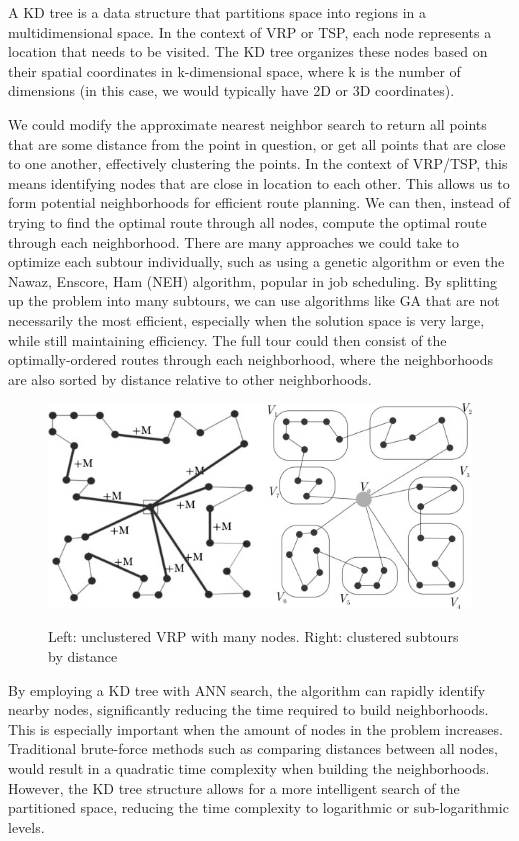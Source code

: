 \documentclass{article}
\begin{document}
A KD tree is a data structure that partitions space into regions in a multidimensional space. In the context of VRP or TSP, each node represents a location that needs to be visited. The KD tree organizes these nodes based on their spatial coordinates in k-dimensional space, where k is the number of dimensions (in this case, we would typically have 2D or 3D coordinates).

We could modify the approximate nearest neighbor search to return all points that are some distance from the point in question, or get all points that are close to one another, effectively clustering the points. In the context of VRP/TSP, this means identifying nodes that are close in location to each other. This allows us to form potential neighborhoods for efficient route planning. We can then, instead of trying to find the optimal route through all nodes, compute the optimal route through each neighborhood. There are many approaches we could take to optimize each subtour individually, such as using a genetic algorithm or even the Nawaz, Enscore, Ham (NEH) algorithm, popular in job scheduling. By splitting up the problem into many subtours, we can use algorithms like GA that are not necessarily the most efficient, especially when the solution space is very large, while still maintaining efficiency. The full tour could then consist of the optimally-ordered routes through each neighborhood, where the neighborhoods are also sorted by distance relative to other neighborhoods.

\begin{figure}[h]
    \centering
    \includegraphics[width=\textwidth,keepaspectratio]{Images/vrp_cluster.jpg}
    \label{fig:clustered_vrp}
    \caption{Left: unclustered VRP with many nodes. Right: clustered subtours by distance}
\end{figure}


By employing a KD tree with ANN search, the algorithm can rapidly identify nearby nodes, significantly reducing the time required to build neighborhoods. This is especially important when the amount of nodes in the problem increases. Traditional brute-force methods such as comparing distances between all nodes, would result in a quadratic time complexity when building the neighborhoods. However, the KD tree structure allows for a more intelligent search of the partitioned space, reducing the time complexity to logarithmic or sub-logarithmic levels.
\end{document}
